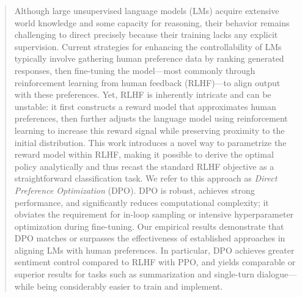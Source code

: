 \begin{abstract}
Although large unsupervised language models (LMs) acquire extensive world knowledge and some capacity for reasoning, their behavior remains challenging to direct precisely because their training lacks any explicit supervision. Current strategies for enhancing the controllability of LMs typically involve gathering human preference data by ranking generated responses, then fine-tuning the model—most commonly through reinforcement learning from human feedback (RLHF)—to align output with these preferences. Yet, RLHF is inherently intricate and can be unstable: it first constructs a reward model that approximates human preferences, then further adjusts the language model using reinforcement learning to increase this reward signal while preserving proximity to the initial distribution. This work introduces a novel way to parametrize the reward model within RLHF, making it possible to derive the optimal policy analytically and thus recast the standard RLHF objective as a straightforward classification task. We refer to this approach as \textit{Direct Preference Optimization} (DPO). DPO is robust, achieves strong performance, and significantly reduces computational complexity; it obviates the requirement for in-loop sampling or intensive hyperparameter optimization during fine-tuning. Our empirical results demonstrate that DPO matches or surpasses the effectiveness of established approaches in aligning LMs with human preferences. In particular, DPO achieves greater sentiment control compared to RLHF with PPO, and yields comparable or superior results for tasks such as summarization and single-turn dialogue—while being considerably easier to train and implement.
\end{abstract}


